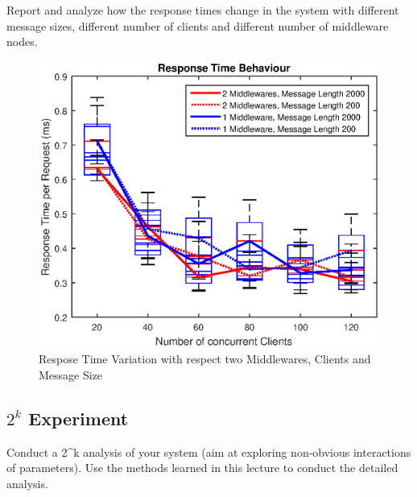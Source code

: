 \documentclass[11pt]{article}
\begin{document}
Report and analyze how the response times change in the system with
different message sizes, different number of clients and different
number of middleware nodes.
\begin{figure}[!htb]
\centering
\includegraphics[width=0.7\linewidth]{figures/rt_experiment}
\caption{Respose Time Variation with respect two Middlewares, Clients and Message Size}
\label{fig:rt_experiment}
\end{figure}


\subsection{$2^k$ Experiment}\label{sec:k-experiment}

Conduct a 2\^{}k analysis of your system (aim at exploring non-obvious
interactions of parameters). Use the methods learned in this lecture to
conduct the detailed analysis.
\end{document}
